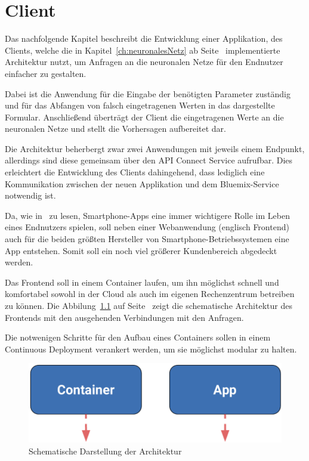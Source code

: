\chapter{Client}
\label{ch:client}
Das nachfolgende Kapitel beschreibt die Entwicklung einer Applikation, des Clients, welche die in
Kapitel~\ref{ch:neuronalesNetz} ab Seite~\pageref{ch:neuronalesNetz} implementierte Architektur nutzt, um Anfragen an
die neuronalen Netze für den Endnutzer einfacher zu gestalten.

Dabei ist die Anwendung für die Eingabe der benötigten Parameter zuständig und für das Abfangen von falsch eingetragenen
Werten in das dargestellte Formular. Anschließend überträgt der Client die eingetragenen Werte an die neuronalen Netze
und stellt die Vorhersagen aufbereitet dar.

Die Architektur beherbergt zwar zwei Anwendungen mit jeweils einem Endpunkt, allerdings sind diese gemeinsam über
den API Connect Service aufrufbar. Dies erleichtert die Entwicklung des Clients dahingehend, dass lediglich eine
Kommunikation zwischen der neuen Applikation und dem Bluemix-Service notwendig ist.

Da, wie in~\cite{online_client_apps} zu lesen, Smartphone-Apps eine immer wichtigere Rolle im Leben eines Endnutzers
spielen, soll neben einer Webanwendung (englisch Frontend) auch für die beiden größten Hersteller von
Smartphone-Betriebssystemen eine App entstehen. Somit soll ein noch viel größerer Kundenbereich abgedeckt werden.

Das Frontend soll in einem Container laufen, um ihn möglichst schnell und komfortabel sowohl in der Cloud als auch
im eigenen Rechenzentrum betreiben zu können. Die Abbilung~\ref{fig:schematische_architektur_4} auf
Seite~\pageref{fig:schematische_architektur_4} zeigt die schematische Architektur des Frontends mit den ausgehenden
Verbindungen mit den Anfragen.

Die notwenigen Schritte für den Aufbau eines Containers sollen in einem Continuous Deployment verankert werden, um sie
möglichst modular zu halten.

\begin{figure}[h]
    \centering
    \includegraphics[scale=0.5]{images/kapitel_4/architektur_schematisch.pdf}
    \caption{Schematische Darstellung der Architektur}
    \label{fig:schematische_architektur_4}
\end{figure}
